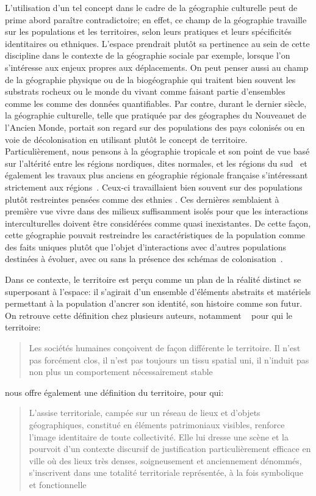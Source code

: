 L'utilisation d'un tel concept dans le cadre de la géographie culturelle peut de prime abord paraître contradictoire; en effet, ce champ de la géographie travaille  sur les populations et les territoires, selon leurs pratiques et leurs spécificités identitaires ou ethniques. 
L'espace prendrait plutôt sa pertinence au sein de cette discipline dans le contexte de la géographie sociale par exemple, lorsque l'on s'intéresse aux enjeux propres aux déplacements.
On peut penser aussi au champ de la géographie physique ou de la biogéographie qui traitent bien souvent les substrats rocheux ou le monde du vivant comme faisant partie d'ensembles comme les  comme des données quantifiables. 
Par contre, durant le dernier siècle, la géographie culturelle, telle que pratiquée par des géographes du Nouveau\missref et de l'Ancien Monde\missref, portait son regard sur des populations des pays colonisés ou en voie de décolonisation en utilisant plutôt le concept de territoire. 
Particulièrement, nous pensons à la géographie tropicale et son point de vue basé sur l'altérité entre les régions nordiques, dites normales, et les régions du sud~\citep[493]{Power2009} et également les travaux plus anciens en géographie régionale française s'intéressant strictement aux régions~\citep[31]{Courville1991}. 
Ceux-ci travaillaient bien souvent sur des populations plutôt restreintes pensées comme des ethnies .
Ces dernières semblaient à première vue vivre dans des milieux suffisamment isolés pour que les interactions interculturelles doivent être considérées comme quasi inexistantes. 
De cette façon, cette géographie pouvait restreindre les caractéristiques de la population comme des faits uniques plutôt que l'objet d'interactions avec d'autres populations destinées à évoluer, avec ou sans la présence des schémas de colonisation~\citep[79--80]{DiMeo2007}.

Dans ce contexte, le territoire est perçu comme un plan de la réalité distinct se superposant à l'espace: il s'agirait d'un ensemble d'éléments abstraits et matériels permettant à la population d'ancrer son identité, son histoire comme son futur. 
On retrouve cette définition chez plusieurs auteurs, notamment ~\citeauthor{Bonnemaison1981} pour qui le territoire:
\blockquote[{\cite[253]{Bonnemaison1981}}][.]{Les sociétés humaines conçoivent de façon différente le territoire. Il n'est pas forcément clos, il n'est pas toujours un tissu spatial uni, il n'induit pas non plus un comportement nécessairement stable}. 
\citeauthor{DiMeo2007} nous offre également une définition du territoire, pour qui:
\blockquote[{\cite[76]{DiMeo2007}}][.]{L’assise territoriale, campée sur un réseau de lieux et d’objets géographiques, constitué en éléments patrimoniaux visibles, renforce l’image identitaire de toute collectivité. Elle lui dresse une scène et la pourvoit d’un contexte discursif de justification particulièrement efficace en ville où des lieux très denses, soigneusement et anciennement dénommés, s’inscrivent dans une totalité territoriale représentée, à la fois symbolique et fonctionnelle}. 

